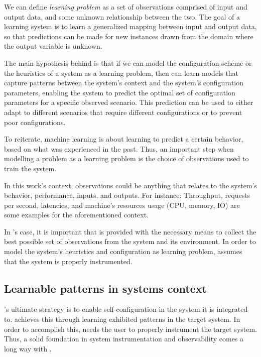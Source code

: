 We can define \emph{learning problem} as a set of observations comprised of input and output data, and some unknown relationship between the two. The goal of a learning system is to learn a generalized mapping between input and output data, so that predictions can be made for new instances drawn from the domain where the output variable is unknown.

The main hypothesis behind \projectname{} is that if we can model the configuration scheme or the heuristics of a system as a learning problem, then \projectname{} can learn models that capture patterns between the system's context and the system's configuration parameters, enabling the system to predict the optimal set of configuration parameters for a specific observed scenario. This prediction can be used to either adapt to different scenarios that require different configurations or to prevent poor configurations.

To reiterate, machine learning is about learning to predict a certain behavior, based on what was experienced in the past. Thus, an important step when modelling a problem as a learning problem is the choice of observations used to train the system.

In this work's context, observations could be anything that relates to the system's behavior, performance, inputs, and outputs. For instance: Throughput, requests per second, latencies, and machine's resources usage (CPU, memory, IO) are some examples for the aforementioned context.

In \projectname{}'s case, it is important that \projectname{} is provided with the necessary means to collect the best possible set of observations from the system and its environment. In order to model the system's heuristics and configuration as learning problem, \projectname{} assumes that the system is properly instrumented.

\subsection{Learnable patterns in systems context}

\projectname{}'s ultimate strategy is to enable self-configuration in the system it is integrated to. \projectname{} achieves this through learning exhibited patterns in the target system. In order to accomplish this, \projectname{} needs the user to properly instrument the target system. Thus, a solid foundation in system instrumentation and observability comes a long way with \projectname{}.

